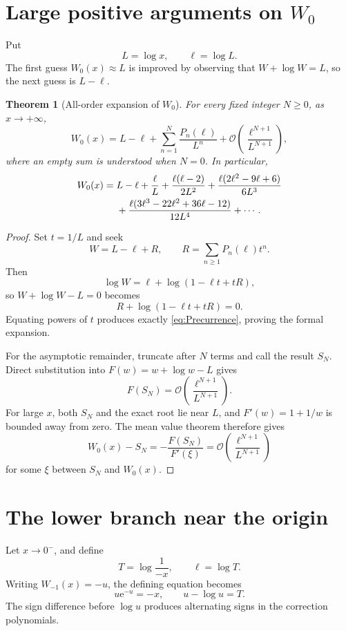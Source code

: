 \documentclass[11pt,openany]{book}
\newcommand{\e}{\mathrm{e}}
\newcommand{\Wzero}{W_0}
\newcommand{\bigO}{\mathcal{O}}
\theoremstyle{plain}
\newtheorem{theorem}{Theorem}[chapter]
\theoremstyle{definition}
\theoremstyle{remark}
\begin{document}
\section{Large positive arguments on \texorpdfstring{\(W_0\)}{W0}}
Put
\[
             L=\log x,
             \qquad \ell=\log L.
\]
The first guess \(W_0(x)\approx L\) is improved by observing that
\(W+\log W=L\), so the next guess is \(L-\ell\).

\begin{theorem}[All-order expansion of \(W_0\)]\label{thm:w0asymp}
For every fixed integer \(N\ge0\), as \(x\to+\infty\),
\begin{equation}\label{eq:w0asymp}
 \Wzero(x)=L-\ell+\sum_{n=1}^{N}\frac{P_n(\ell)}{L^n}
 +\bigO\left(\frac{\ell^{N+1}}{L^{N+1}}\right),
\end{equation}
where an empty sum is understood when \(N=0\).  In particular,
\begin{align}
 W_0(x)={}&L-\ell+\frac{\ell}{L}
 +\frac{\ell(\ell-2)}{2L^2}
 +\frac{\ell(2\ell^2-9\ell+6)}{6L^3}\notag\\
 &+\frac{\ell(3\ell^3-22\ell^2+36\ell-12)}{12L^4}
 +\cdots.
\label{eq:w0asympexplicit}
\end{align}
\end{theorem}

\begin{proof}
Set \(t=1/L\) and seek
\[
 W=L-\ell+R,
 \qquad R=\sum_{n\ge1}P_n(\ell)t^n.
\]
Then
\[
 \log W=\ell+
 \log\left(1-\ell t+tR\right),
\]
so \(W+\log W-L=0\) becomes
\[
 R+\log(1-\ell t+tR)=0.
\]
Equating powers of \(t\) produces exactly \eqref{eq:Precurrence}, proving the
formal expansion.

For the asymptotic remainder, truncate after \(N\) terms and call the result
\(S_N\).  Direct substitution into \(F(w)=w+\log w-L\) gives
\[
 F(S_N)=\bigO\left(\frac{\ell^{N+1}}{L^{N+1}}\right).
\]
For large \(x\), both \(S_N\) and the exact root lie near \(L\), and
\(F'(w)=1+1/w\) is bounded away from zero.  The mean value theorem therefore
gives
\[
 W_0(x)-S_N=-\frac{F(S_N)}{F'(\xi)}
 =\bigO\left(\frac{\ell^{N+1}}{L^{N+1}}\right)
\]
for some \(\xi\) between \(S_N\) and \(W_0(x)\).
\end{proof}

\section{The lower branch near the origin}\label{sec:wm1asymp}
Let \(x\to0^-\), and define
\[
       T=\log\frac1{-x},
       \qquad \ell=\log T.
\]
Writing \(W_{-1}(x)=-u\), the defining equation becomes
\[
       u\e^{-u}=-x,
       \qquad u-\log u=T.
\]
The sign difference before \(\log u\) produces alternating signs in the
correction polynomials.
\end{document}

